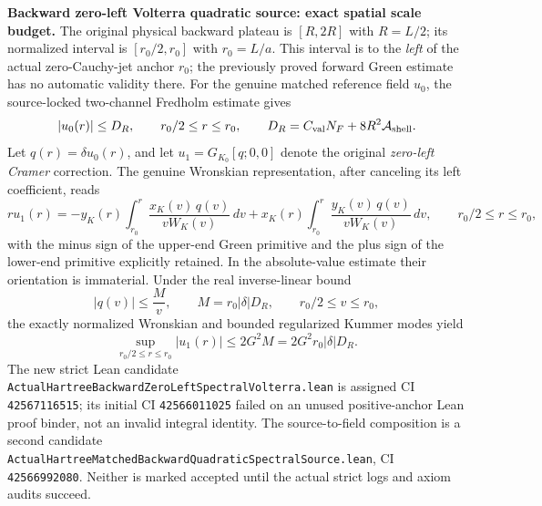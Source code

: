 \documentclass[11pt]{amsart}
\begin{document}
\medskip
\noindent\textbf{Backward zero-left Volterra quadratic source: exact spatial scale budget.}
The original physical backward plateau is
\([R,2R]\) with \(R=L/2\); its normalized interval is
\([r_0/2,r_0]\) with \(r_0=L/a\). This interval is to the
\emph{left} of the actual zero-Cauchy-jet anchor \(r_0\);
the previously proved forward Green estimate has no automatic
validity there. For the genuine matched reference field
\(u_0\), the source-locked two-channel Fredholm estimate gives
\[
 |u_0(r)|\le D_R,\qquad r_0/2\le r\le r_0,
 \qquad
 D_R=C_{\rm val}N_F+8R^2\mathcal A_{\rm shell}.
\]
Let \(q(r)=\delta u_0(r)\), and let
\(u_1=G_{K_0}[q;0,0]\) denote the original
\emph{zero-left Cramer} correction.
The genuine Wronskian representation, after canceling its
left coefficient, reads
\[
 r u_1(r)=
 -y_K(r)\int_{r_0}^{r}\frac{x_K(v)\,q(v)}
              {vW_K(v)}\,dv
 +x_K(r)\int_{r_0}^{r}\frac{y_K(v)\,q(v)}
              {vW_K(v)}\,dv,
 \qquad r_0/2\le r\le r_0,
\]
with the minus sign of the upper-end Green primitive and the plus
sign of the lower-end primitive explicitly retained. In the absolute-value
estimate their orientation is immaterial. Under the real
inverse-linear bound
\[
 |q(v)|\le \frac{M}{v},\qquad
 M=r_0|\delta|D_R,
 \qquad r_0/2\le v\le r_0,
\]
the exactly normalized Wronskian and bounded regularized
Kummer modes yield
\begin{equation}
 \sup_{r_0/2\le r\le r_0}|u_1(r)|
 \le2G^2M=2G^2r_0|\delta|D_R.
 \label{eq:hbl-backward-zerojet-spectral-value}
\end{equation}
The new strict Lean candidate
\texttt{ActualHartreeBackwardZeroLeftSpectralVolterra.lean}
is assigned CI \texttt{42567116515}; its initial
CI \texttt{42566011025} failed on an unused positive-anchor
Lean proof binder, not an invalid integral identity.
The source-to-field composition is a second candidate
\texttt{ActualHartreeMatchedBackwardQuadraticSpectralSource.lean},
CI \texttt{42566992080}. Neither is marked accepted until
the actual strict logs and axiom audits succeed.
\end{document}
